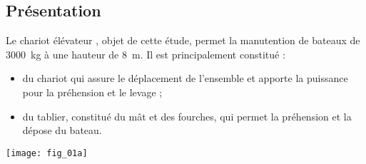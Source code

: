 \ifprof
\else
\begin{multicols}{2}
\fi

\subsection*{Présentation}
Le chariot élévateur , objet de cette étude,  permet la manutention de bateaux de \SI{3000}{kg}
à une hauteur de \SI{8}{m}. Il est principalement constitué :
\begin{itemize}
\item du chariot qui assure le déplacement de l’ensemble et apporte la puissance pour la préhension
et le levage ;
\item du tablier, constitué du mât et des fourches, qui permet la préhension et la dépose du bateau.
\end{itemize}

\begin{center}
\texttt{[image: fig\_01a]}
\end{center} 




\end{multicols}
